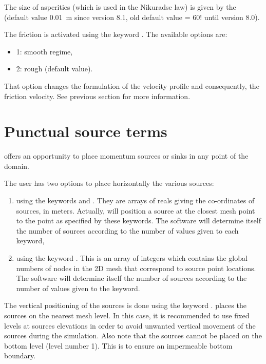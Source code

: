The size of asperities (which is used in the Nikuradse law) is given by the
 (default value
0.01~m since version 8.1, old default value = 60! until version 8.0).

The friction is activated using the keyword . The available options are:

\begin{itemize}
\item  1: smooth regime,

\item  2: rough (default value).
\end{itemize}

That option changes the formulation of the velocity profile and consequently,
the friction velocity. See previous section for more information.

\section{Punctual source terms}
\label{sec:srcfile}
 offers an opportunity to place momentum sources or sinks in any
point of the domain.

The user has two options to place horizontally the various sources:
\begin{enumerate}
\item  using the keywords  and
. They are arrays of reals giving the co-ordinates
of sources, in meters. Actually,  will position a source at the
closest mesh point to the point as specified by these keywords. The software
will determine itself the number of sources according to the number of values
given to each keyword,
\item using the keyword .
This is an array of integers which contains the global numbers of nodes
in the 2D mesh that correspond to source point locations. The software
will determine itself the number of sources according to the number of values
given to the keyword.
\end{enumerate}

The vertical positioning of the sources is done using the keyword
.  places the sources on the nearest
mesh level. In this case, it is recommended to use fixed levels at sources
elevations in order to avoid unwanted vertical movement of the sources during
the simulation. Also note that the sources cannot be placed on the bottom level
(level number 1). This is to ensure an impermeable bottom boundary.

